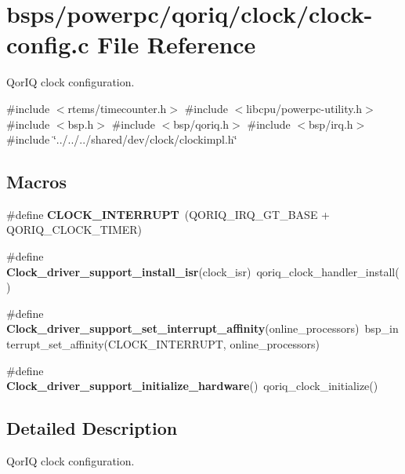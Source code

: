 \hypertarget{qoriq_2clock_2clock-config_8c}{}\section{bsps/powerpc/qoriq/clock/clock-\/config.c File Reference}
\label{qoriq_2clock_2clock-config_8c}


Qor\+IQ clock configuration.  


{\ttfamily \#include $<$rtems/timecounter.\+h$>$}\newline
{\ttfamily \#include $<$libcpu/powerpc-\/utility.\+h$>$}\newline
{\ttfamily \#include $<$bsp.\+h$>$}\newline
{\ttfamily \#include $<$bsp/qoriq.\+h$>$}\newline
{\ttfamily \#include $<$bsp/irq.\+h$>$}\newline
{\ttfamily \#include \char`\"{}../../../shared/dev/clock/clockimpl.\+h\char`\"{}}\newline
\subsection*{Macros}
\begin{DoxyCompactItemize}
\item 
\mbox{\label{qoriq_2clock_2clock-config_8c_ae5bef742d4a20392f7f30dcb10f0dba7}} 
\#define {\bfseries C\+L\+O\+C\+K\+\_\+\+I\+N\+T\+E\+R\+R\+U\+PT}~(Q\+O\+R\+I\+Q\+\_\+\+I\+R\+Q\+\_\+\+G\+T\+\_\+\+B\+A\+SE + Q\+O\+R\+I\+Q\+\_\+\+C\+L\+O\+C\+K\+\_\+\+T\+I\+M\+ER)
\item 
\mbox{\label{qoriq_2clock_2clock-config_8c_afc7a71a9772acad6f5a0b0ec5c31175c}} 
\#define {\bfseries Clock\+\_\+driver\+\_\+support\+\_\+install\+\_\+isr}(clock\+\_\+isr)~qoriq\+\_\+clock\+\_\+handler\+\_\+install()
\item 
\mbox{\label{qoriq_2clock_2clock-config_8c_a6d50e63577472e1a7899c19f75dc54b8}} 
\#define {\bfseries Clock\+\_\+driver\+\_\+support\+\_\+set\+\_\+interrupt\+\_\+affinity}(online\+\_\+processors)~bsp\+\_\+interrupt\+\_\+set\+\_\+affinity(C\+L\+O\+C\+K\+\_\+\+I\+N\+T\+E\+R\+R\+U\+PT, online\+\_\+processors)
\item 
\mbox{\label{qoriq_2clock_2clock-config_8c_a37475981ff0420ed43474fb3bdde8cbf}} 
\#define {\bfseries Clock\+\_\+driver\+\_\+support\+\_\+initialize\+\_\+hardware}()~qoriq\+\_\+clock\+\_\+initialize()
\end{DoxyCompactItemize}


\subsection{Detailed Description}
Qor\+IQ clock configuration. 

